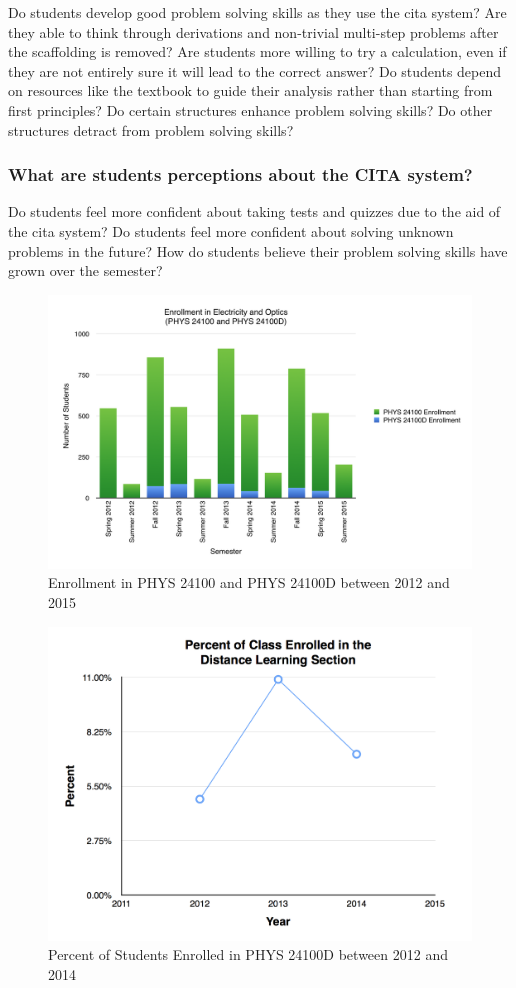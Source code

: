 Do students develop good problem solving skills as they use the \gls{cita} system? Are they able to think through derivations and non-trivial multi-step problems after the scaffolding is removed? Are students more willing to try a calculation, even if they are not entirely sure it will lead to the correct answer? Do students depend on resources like the textbook to guide their analysis rather than starting from first principles? Do certain structures enhance problem solving skills? Do other structures detract from problem solving skills?

\subsubsection{What are students perceptions about the CITA system?}

Do students feel more confident about taking tests and quizzes due to the aid of the \gls{cita} system? Do students feel more confident about solving unknown problems in the future? How do students believe their problem solving skills have grown over the semester?

\begin{figure}
	\centering
	\includegraphics[width=6in]{img/chapter1/enrollment}
	\caption{Enrollment in PHYS 24100 and PHYS 24100D between 2012 and 2015}
	\label{fig:enrollment}
\end{figure}

\begin{figure}
	\centering
	\includegraphics[width=6in]{img/chapter1/percent}
	\caption[Percent of Students Enrolled in PHYS 24100D between 2012 and 2014]{Percent of Students Enrolled in PHYS 24100D between 2012 and 2014}
	\label{fig:percent}
\end{figure}